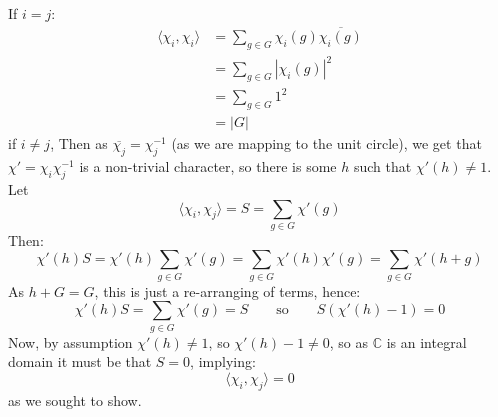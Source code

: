 \documentclass{article}
\newcommand{\C}{{\mathbb{C}}}
\begin{document}
\begin{Proof}
	If $i = j$:
	\begin{align*}
		\langle \chi_i, \chi_i \rangle &= \sum_{g\in G} \chi_i(g)\overline{\chi_i(g)}\\
									   &= \sum_{g \in G} |\chi_i(g)|^2\\
									   &= \sum_{g \in G} 1^2\\
									   &= |G|
	\end{align*}
	if $i \ne j$, Then as $\overline{\chi_j} = \chi_j^{-1}$ (as we are mapping to the unit circle), we get
	that $\chi' = \chi_i\chi_j^{-1}$ is a non-trivial character, so there is some $h$ such that $\chi'(h) \ne
	1$. Let
	\[
		\langle \chi_i, \chi_j \rangle = S = \sum_{g \in G} \chi'(g)
	\]
	Then:
	\[
		\chi'(h) S = \chi'(h) \sum_{g \in G} \chi'(g) = \sum_{g \in G} \chi'(h)\chi'(g) = \sum_{g \in G} \chi'(h+g)
	\]
	As $h+G = G$, this is just a re-arranging of terms, hence:
	\[
		\chi'(h)S =\sum_{g \in G} \chi'(g) = S \qquad \text{so} \qquad S(\chi'(h)-1) = 0
	\]
	Now, by assumption $\chi'(h)\ne 1$, so $\chi'(h)-1\ne 0$, so as $\C$ is an integral domain it must be that
	$S = 0$, implying:
	\[
		\langle \chi_i, \chi_j \rangle = 0
	\]
	as we sought to show.
\end{Proof}
\end{document}
